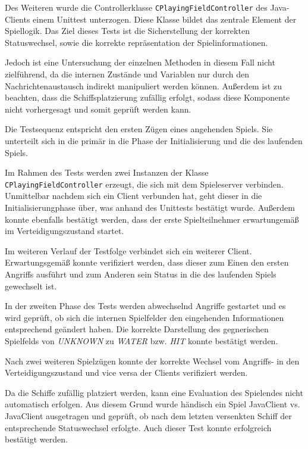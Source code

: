 Des Weiteren wurde die Controllerklasse \texttt{CPlayingFieldController} des Java-Clients einem Unittest unterzogen.
Diese Klasse bildet das zentrale Element der Spiellogik.
Das Ziel dieses Tests ist die Sicherstellung der korrekten Statuswechsel, sowie die korrekte repräsentation der Spielinformationen.

Jedoch ist eine Untersuchung der einzelnen Methoden in diesem Fall nicht zielführend, da die internen Zustände und Variablen nur durch den Nachrichtenaustausch indirekt manipuliert werden können.
Außerdem ist zu beachten, dass die Schiffsplatzierung zufällig erfolgt, sodass diese Komponente nicht vorhergesagt und somit geprüft werden kann.

Die Testsequenz entspricht den ersten Zügen eines angehenden Spiels. 
Sie unterteilt sich in die primär in die Phase der Initialisierung und die des laufenden Spiels.

Im Rahmen des Tests werden zwei Instanzen der Klasse \texttt{CPlayingFieldController} erzeugt, die sich mit dem Spieleserver verbinden.
Unmittelbar nachdem sich ein Client verbunden hat, geht dieser in die Initialisierungphase über, was anhand des Unittests bestätigt wurde.
Außerdem konnte ebenfalls bestätigt werden, dass der erste Spielteilnehmer erwartungemäß im Verteidigungszustand startet.

Im weiteren Verlauf der Testfolge verbindet sich ein weiterer Client.
Erwartungsgemäß konnte verifiziert werden, dass dieser zum Einen den ersten Angriffs ausführt und zum Anderen sein Status in die des laufenden Spiels gewechselt ist.

In der zweiten Phase des Tests werden abwechselnd Angriffe gestartet und es wird geprüft, ob sich die internen Spielfelder den eingehenden Informationen entsprechend geändert haben.
Die korrekte Darstellung des gegnerischen Spielfelds von \emph{UNKNOWN} zu \emph{WATER} bzw. \emph{HIT} konnte bestätigt werden.

Nach zwei weiteren Spielzügen konnte der korrekte Wechsel vom Angriffs- in den Verteidigungszustand und vice versa der Clients verifiziert werden.

Da die Schiffe zufällig platziert werden, kann eine Evaluation des Spielendes nicht automatisch erfolgen.
Aus diesem Grund wurde händisch ein Spiel JavaClient vs. JavaClient ausgetragen und geprüft, ob nach dem letzten versenkten Schiff der entsprechende Statuswechsel erfolgte.
Auch dieser Test konnte erfolgreich bestätigt werden.